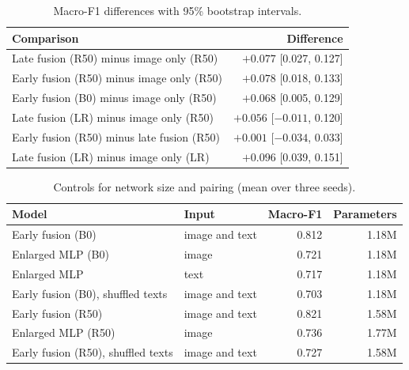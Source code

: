 \documentclass[11pt,a4paper]{article}
\begin{document}
\begin{table}[H]
  \centering
  \small
  \caption{Macro-F1 differences with 95\% bootstrap intervals.}
  \label{tab:pairs}
  \begin{tabular}{lr}
    \toprule
    Comparison & Difference \\
    \midrule
    Late fusion (R50) minus image only (R50) & $+0.077$ [0.027, 0.127] \\
    Early fusion (R50) minus image only (R50) & $+0.078$ [0.018, 0.133] \\
    Early fusion (B0) minus image only (R50) & $+0.068$ [0.005, 0.129] \\
    Late fusion (LR) minus image only (R50) & $+0.056$ [$-0.011$, 0.120] \\
    Early fusion (R50) minus late fusion (R50) & $+0.001$ [$-0.034$, 0.033] \\
    Late fusion (LR) minus image only (LR) & $+0.096$ [0.039, 0.151] \\
    \bottomrule
  \end{tabular}
\end{table}

\begin{table}[H]
  \centering
  \small
  \caption{Controls for network size and pairing (mean over three
  seeds).}
  \label{tab:controls}
  \begin{tabular}{llrr}
    \toprule
    Model & Input & Macro-F1 & Parameters \\
    \midrule
    Early fusion (B0) & image and text & 0.812 & 1.18M \\
    Enlarged MLP (B0) & image & 0.721 & 1.18M \\
    Enlarged MLP & text & 0.717 & 1.18M \\
    Early fusion (B0), shuffled texts & image and text & 0.703 & 1.18M \\
    \midrule
    Early fusion (R50) & image and text & 0.821 & 1.58M \\
    Enlarged MLP (R50) & image & 0.736 & 1.77M \\
    Early fusion (R50), shuffled texts & image and text & 0.727 & 1.58M \\
    \bottomrule
  \end{tabular}
\end{table}
\end{document}
